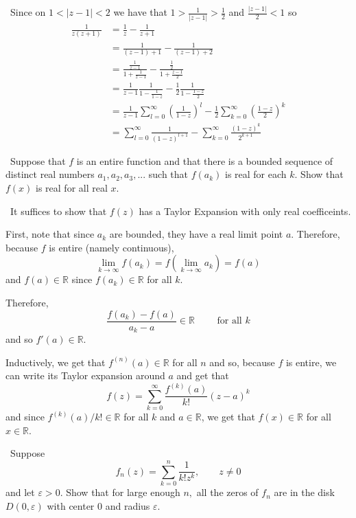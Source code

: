 \documentclass[12pt]{Qual}
\begin{document}
\begin{solution}$\,$
Since on $1<|z-1|<2$ we have that $1>\frac{1}{|z-1|}>\frac{1}{2}$ and $\frac{|z-1|}{2}<1$ so \begin{align*}
    \frac{1}{z(z+1)}&=\frac{1}{z}-\frac{1}{z+1}\\
    &=\frac{1}{(z-1)+1}-\frac{1}{(z-1)+2}\\
    &=\frac{\frac{1}{z-1}}{1+\frac{1}{z-1}}-\frac{\frac{1}{2}}{1+\frac{z-1}{2}}\\
    &=\frac{1}{z-1}\frac{1}{1-\frac{1}{1-z}}-\frac{1}{2}\frac{1}{1-\frac{1-z}{2}}\\
    &=\frac{1}{z-1}\sum_{l=0}^\infty\left(\frac{1}{1-z}\right)^l-\frac{1}{2}\sum_{k=0}^\infty\left(\frac{1-z}{2}\right)^k\\
    &=\sum_{l=0}^\infty\frac{1}{(1-z)^{l+1}}-\sum_{k=0}^\infty\frac{(1-z)^k}{2^{k+1}}
\end{align*}
\end{solution}
\newpage

\begin{problem} $\,$
Suppose that $f$ is an entire function and that there is a bounded sequence of distinct real numbers $a_1,a_2,a_3,...$ such that $f(a_k)$ is real for each $k.$ Show that $f(x)$ is real for all real $x.$
\end{problem}


\begin{solution}$\,$
It suffices to show that $f(z)$ has a Taylor Expansion with only real coefficeints.

First, note that since $a_k$ are bounded, they have a real limit point $a$. Therefore, because $f$ is entire (namely continuous), $$\lim_{k\to\infty}f(a_k)=f\left(\lim_{k\to\infty}a_k\right)=f(a)$$ and $f(a)\in\mathbb{R}$ since $f(a_k)\in\mathbb{R}$ for all $k$.

Therefore, $$\frac{f(a_k)-f(a)}{a_k-a}\in\mathbb{R}\qquad\text{ for all }k$$ and so $f'(a)\in\mathbb{R}$.

Inductively, we get that $f^{(n)}(a)\in\mathbb{R}$ for all $n$ and so, because $f$ is entire, we can write its Taylor expansion around $a$ and get that $$f(z)=\sum_{k=0}^\infty\frac{f^{(k)}(a)}{k!}(z-a)^k$$ and since $f^{(k)}(a)/k!\in\mathbb{R}$ for all $k$ and $a\in\mathbb{R}$, we get that $f(x)\in\mathbb{R}$ for all $x\in\mathbb{R}$.
\end{solution}
\newpage





\begin{problem} $\,$
Suppose $$f_n(z)=\sum_{k=0}^n\frac{1}{k!z^k},\qquad z\not=0$$ and let $\varepsilon>0$. Show that for large enough $n,$ all the zeros of $f_n$ are in the disk $D(0,\varepsilon)$ with center $0$ and radius $\varepsilon.$
\end{problem}
\end{document}

